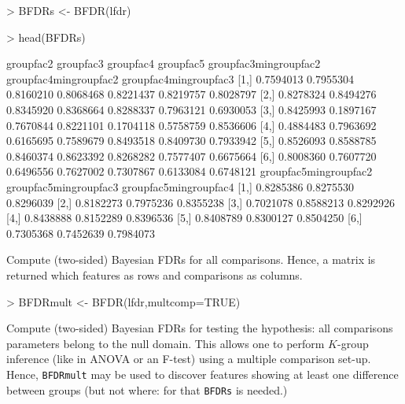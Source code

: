 \documentclass[11pt]{article}
\begin{document}
\begin{Schunk}
\begin{Sinput}
> BFDRs <- BFDR(lfdr)
\end{Sinput}
\end{Schunk}
\begin{Schunk}
\begin{Sinput}
> head(BFDRs)
\end{Sinput}
\begin{Soutput}
     groupfac2 groupfac3 groupfac4 groupfac5 groupfac3mingroupfac2 groupfac4mingroupfac2 groupfac4mingroupfac3
[1,] 0.7594013 0.7955304 0.8160210 0.8068468             0.8221437             0.8219757             0.8028797
[2,] 0.8278324 0.8494276 0.8345920 0.8368664             0.8288337             0.7963121             0.6930053
[3,] 0.8425993 0.1897167 0.7670844 0.8221101             0.1704118             0.5758759             0.8536606
[4,] 0.4884483 0.7963692 0.6165695 0.7589679             0.8493518             0.8409730             0.7933942
[5,] 0.8526093 0.8588785 0.8460374 0.8623392             0.8268282             0.7577407             0.6675664
[6,] 0.8008360 0.7607720 0.6496556 0.7627002             0.7307867             0.6133084             0.6748121
     groupfac5mingroupfac2 groupfac5mingroupfac3 groupfac5mingroupfac4
[1,]             0.8285386             0.8275530             0.8296039
[2,]             0.8182273             0.7975236             0.8355238
[3,]             0.7021078             0.8588213             0.8292926
[4,]             0.8438888             0.8152289             0.8396536
[5,]             0.8408789             0.8300127             0.8504250
[6,]             0.7305368             0.7452639             0.7984073
\end{Soutput}
\end{Schunk}
Compute (two-sided) Bayesian FDRs for all comparisons. Hence, a matrix is returned which features as rows and
comparisons as columns.

\begin{Schunk}
\begin{Sinput}
> BFDRmult <- BFDR(lfdr,multcomp=TRUE)
\end{Sinput}
\end{Schunk}

Compute (two-sided) Bayesian FDRs for testing the hypothesis: all comparisons parameters belong to the null domain.
This allows one to perform $K$-group inference (like in ANOVA or an F-test) using a multiple comparison set-up. Hence,
{\tt BFDRmult} may be used to discover features showing at least one difference between groups (but not where: for that {\tt BFDRs}
is needed.)
\end{document}
